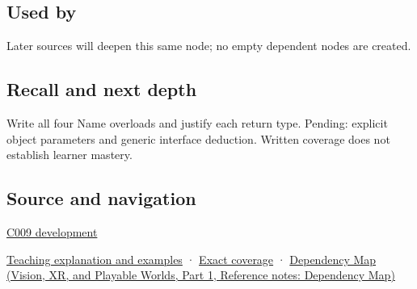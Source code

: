 \subsection{Used by}\label{appendix-d42039b1d6f7-used-by}

\hypertarget{appendix-d42039b1d6f7-used-by}{}

Later sources will deepen this same node; no empty dependent nodes are created.

\subsection{Recall and next depth}\label{appendix-d42039b1d6f7-recall-and-next-depth}

\hypertarget{appendix-d42039b1d6f7-recall-and-next-depth}{}

Write all four Name overloads and justify each return type. Pending: explicit object parameters and generic interface deduction. Written coverage does not establish learner mastery.

\subsection{Source and navigation}\label{appendix-d42039b1d6f7-source-and-navigation}

\hypertarget{appendix-d42039b1d6f7-source-and-navigation}{}

\hyperref[appendix-fd090d982a15-m009---parts-127-147]{C009 development}

\hyperref[01-foundations-i-ch003-an-accessor-must-respect-the-callers-lifetime]{Teaching explanation and examples} · \hyperref[appendix-fd090d982a15-m008---parts-113-126]{Exact coverage} · \href{../07-Vision-XR-and-Playable-Worlds-P01/main.pdf\#nameddest=appendix-4ad47bdd269a}{Dependency Map (Vision, XR, and Playable Worlds, Part 1, Reference notes: Dependency Map)}
